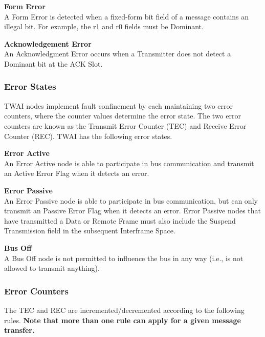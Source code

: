 \documentclass[main\_\_EN.tex]{subfiles}
\begin{document}
{\bfseries Form Error}\\
A Form Error is detected when a fixed-form bit field of a message contains an illegal bit. For example, the r1 and r0 fields must be Dominant.

{\bfseries Acknowledgement Error}\\
An Acknowledgment Error occurs when a Transmitter does not detect a Dominant bit at the ACK Slot.

\subsubsection{Error States}
TWAI nodes implement fault confinement by each maintaining two error counters, where the counter values determine the error state. The two error counters are known as the Transmit Error Counter (TEC) and Receive Error Counter (REC). TWAI has the following error states.

{\bfseries Error Active}\\
An Error Active node is able to participate in bus communication and transmit an Active Error Flag when it detects an error.

{\bfseries Error Passive}\\
An Error Passive node is able to participate in bus communication, but can only transmit an Passive Error Flag when it detects an error. Error Passive nodes that have transmitted a Data or Remote Frame must also include the Suspend Transmission field in the subsequent Interframe Space.

{\bfseries Bus Off}\\
A Bus Off node is not permitted to influence the bus in any way (i.e., is not allowed to transmit anything).

\subsubsection{Error Counters}

The TEC and REC are incremented/decremented according to the following rules. {\bfseries Note that more than one rule can apply for a given message transfer.}
\end{document}

